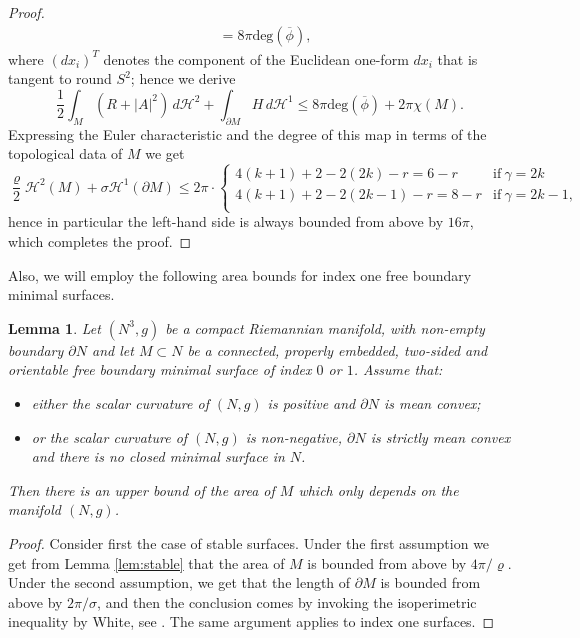 \documentclass[JEP,XML,SOM,Unicode]{cedram}
\newcounter{cas}
\newtheorem{lem}[thm]{Lemma}
\theoremstyle{definition}
\newcommand{\h}{\mathscr{H}}
\begin{document}
\begin{proof}
\begin{align*}
&=8\pi \text{deg}(\overline{\phi}),
\end{align*}
where $(d x_i)^T$ denotes the component of the Euclidean one-form $dx_i$ that is tangent to round $S^2$; hence we derive
\[
\frac{1}{2}\int_{M}(R+|A|^2)\,d\h^2+\int_{\partial M}H\,d\h^1\leq 8\pi \text{deg}(\overline{\phi})+2\pi\chi(M).
\] Expressing the Euler characteristic and the degree of this map in terms of the topological data of $M$ we get
\[
\frac{\varrho}{2} \h^2(M)+\sigma \h^1(\partial M)\leq 2\pi \cdot
\begin{cases}
4(k+1)+2-2(2k)-r  = 6 -r & \text{if} \ \gamma=2k\\
4(k+1)+2-2(2k-1)-r  = 8 -r & \text{if} \ \gamma=2k-1,\\
\end{cases}
\]
hence in particular the left-hand side is always bounded from above by $16\pi$, which completes the proof.
\end{proof}

Also, we will employ the following area bounds for index one free boundary minimal surfaces.

\begin{lem}\label{lem:area}
Let $(N^3,g)$ be a compact Riemannian manifold, with non-empty boundary $\partial N$ and let $M\subset N$ be a connected, properly embedded, two-sided and orientable free boundary minimal surface of index $0$ or $1$.
Assume that:
\begin{itemize}
\item
\emph{either} the scalar curvature of $(N,g)$ is positive and $\partial N$ is mean convex;
\item
\emph{or} the scalar curvature of $(N,g)$ is non-negative, $\partial N$ is strictly mean convex and there is no \emph{closed} minimal surface in $N$.
\end{itemize}
Then there is an upper bound of the area of $M$ which only depends on the manifold $(N,g)$.
\end{lem}

\begin{proof}
Consider first the case of stable surfaces. Under the first assumption we get from Lemma \ref{lem:stable} that the area of $M$ is bounded from above by $4\pi/\varrho$. Under the second assumption, we get that the length of $\partial M$ is bounded from above by $2\pi/\sigma$, and then the conclusion comes
by invoking the isoperimetric inequality by White, see \cite[Th.\,2.1]{Whi09}. The same argument applies to index one surfaces.
\end{proof}
\end{document}
